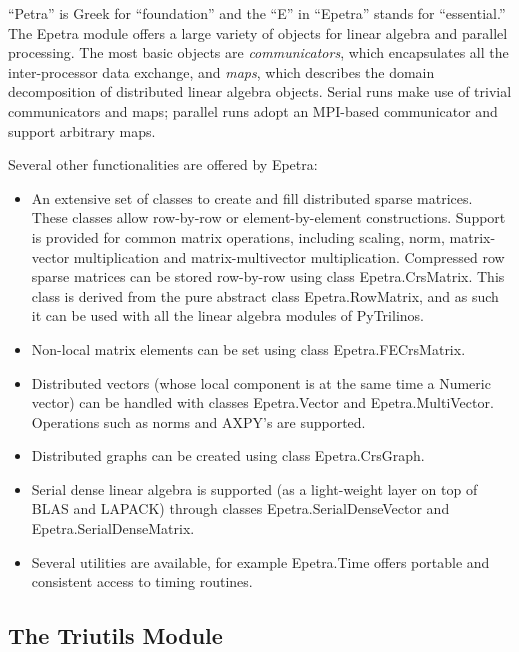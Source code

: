 \documentclass[acmtocl]{acmtrans2m}
\newcommand{\PyTrilinos}{{PyTrilinos}}
\begin{document}
``Petra'' is Greek for ``foundation'' and the ``E'' in ``Epetra''
stands for ``essential.''  The Epetra module offers a large variety of
objects for linear algebra and parallel processing.  The most basic
objects are {\sl communicators}, which encapsulates all the
inter-processor data exchange, and {\sl maps}, which describes the
domain decomposition of distributed linear algebra objects.  Serial
runs make use of trivial communicators and maps; parallel runs adopt
an MPI-based communicator and support arbitrary maps.

Several other functionalities are offered by Epetra:
\begin{itemize}

\item An extensive set of classes to create and fill distributed
  sparse matrices.  These classes allow row-by-row or
  element-by-element constructions.  Support is provided for common
  matrix operations, including scaling, norm, matrix-vector
  multiplication and matrix-multivector multiplication.  Compressed
  row sparse matrices can be stored row-by-row using class
  Epetra.CrsMatrix.  This class is derived from the pure abstract
  class Epetra.RowMatrix, and as such it can be used with all the
  linear algebra modules of \PyTrilinos.

\item Non-local matrix elements can be set using class
  Epetra.FECrsMatrix.

\item Distributed vectors (whose local component is at the same time a
  Numeric vector) can be handled with classes Epetra.Vector and
  Epetra.MultiVector.  Operations such as norms and AXPY's are
  supported.

\item Distributed graphs can be created using class Epetra.CrsGraph.

\item Serial dense linear algebra is supported (as a light-weight
  layer on top of BLAS and LAPACK) through classes
  Epetra.SerialDenseVector and Epetra.SerialDenseMatrix.

\item Several utilities are available, for example Epetra.Time offers
  portable and consistent access to timing routines.

\end{itemize}

\subsection{The Triutils Module}
\label{subsec:triutils}
\end{document}
